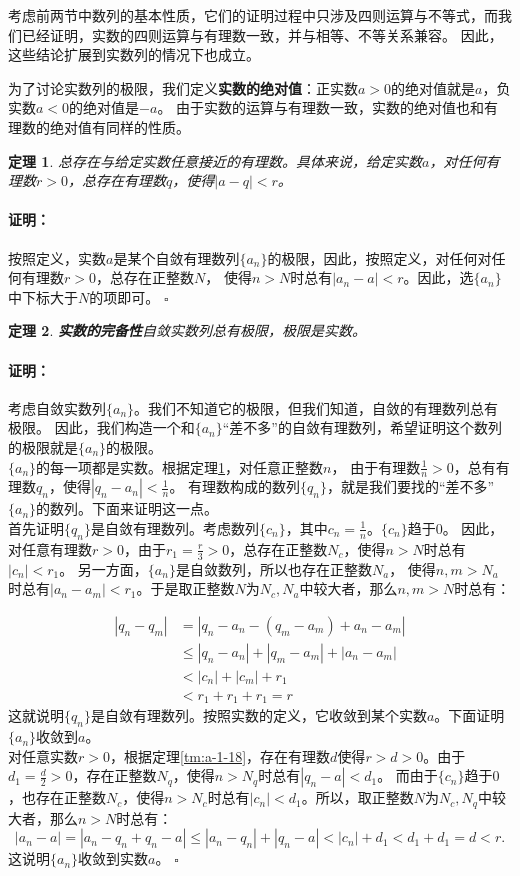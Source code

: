 \documentclass[12pt,UTF8]{ctexbook}
\newtheorem{tm}{定理}[section]
\renewenvironment{proof}{\paragraph{\textbf{证明：}}}{\hfill$\square$}
\begin{document}
\begin{appendix}
考虑前两节中数列的基本性质，它们的证明过程中只涉及四则运算与不等式，而我们已经证明，实数的四则运算与有理数一致，并与相等、不等关系兼容。
因此，这些结论扩展到实数列的情况下也成立。

为了讨论实数列的极限，我们定义\textbf{实数的绝对值}：正实数$a>0$的绝对值就是$a$，负实数$a<0$的绝对值是$-a$。
由于实数的运算与有理数一致，实数的绝对值也和有理数的绝对值有同样的性质。

\begin{tm}\label{tm:a-1-35}
    总存在与给定实数任意接近的有理数。具体来说，给定实数$a$，对任何有理数$r>0$，总存在有理数$q$，使得$|a - q| < r$。
\end{tm}
\begin{proof}
    按照定义，实数$a$是某个自敛有理数列$\{a_n\}$的极限，因此，按照定义，对任何对任何有理数$r>0$，总存在正整数$N$，
    使得$n>N$时总有$|a_n - a| < r$。因此，选$\{a_n\}$中下标大于$N$的项即可。
\end{proof}

\begin{tm}\textbf{实数的完备性}\label{tm:a-1-40}
    自敛实数列总有极限，极限是实数。
\end{tm}

\begin{proof}
    考虑自敛实数列$\{a_n\}$。我们不知道它的极限，但我们知道，自敛的有理数列总有极限。
    因此，我们构造一个和$\{a_n\}$“差不多”的自敛有理数列，希望证明这个数列的极限就是$\{a_n\}$的极限。\\
    $\{a_n\}$的每一项都是实数。根据定理\ref{tm:a-1-35}，对任意正整数$n$，
    由于有理数$\frac{1}{n}>0$，总有有理数$q_n$，使得$|q_n - a_n| < \frac{1}{n}$。
    有理数构成的数列$\{q_n\}$，就是我们要找的“差不多”$\{a_n\}$的数列。下面来证明这一点。\\
    首先证明$\{q_n\}$是自敛有理数列。考虑数列$\{c_n\}$，其中$c_n = \frac{1}{n}$。$\{c_n\}$趋于$0$。
    因此，对任意有理数$r>0$，由于$r_1 = \frac{r}{3} > 0$，总存在正整数$N_c$，使得$n>N$时总有$|c_n| < r_1$。
    另一方面，$\{a_n\}$是自敛数列，所以也存在正整数$N_a$，
    使得$n,m>N_a$时总有$|a_n - a_m| < r_1$。于是取正整数$N$为$N_c,N_a$中较大者，那么$n,m>N$时总有：

    \begin{align*}
        |q_n - q_m| &= |q_n - a_n - (q_m - a_m) + a_n -a_m|  \\
        &\leqslant |q_n - a_n| + |q_m - a_m| + |a_n - a_m|  \\
        &< |c_n| + |c_m| + r_1  \\
        &< r_1 + r_1 + r_1 = r 
    \end{align*}
    这就说明$\{q_n\}$是自敛有理数列。按照实数的定义，它收敛到某个实数$a$。下面证明$\{a_n\}$收敛到$a$。\\
    对任意实数$r>0$，根据定理\ref{tm:a-1-18}，存在有理数$d$使得$r>d>0$。由于$d_1 = \frac{d}{2}>0$，存在正整数$N_q$，使得$n>N_q$时总有$|q_n - a| < d_1$。
    而由于$\{c_n\}$趋于$0$，也存在正整数$N_c$，使得$n>N_c$时总有$|c_n| < d_1$。所以，取正整数$N$为$N_c,N_q$中较大者，那么$n>N$时总有：
    $$ |a_n - a| = |a_n - q_n + q_n - a| \leqslant |a_n - q_n| + |q_n - a| < |c_n| + d_1 < d_1 + d_1 = d < r.$$
    这说明$\{a_n\}$收敛到实数$a$。
\end{proof}


\end{appendix}
\end{document}
